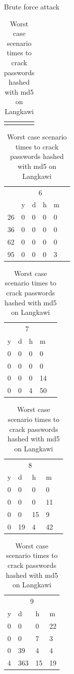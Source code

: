 \documentclass[12pt,aspectratio=169]{beamer}
\begin{document}
\begin{frame}{Brute force attack}
  \begin{table}
    \begin{tabular}{p{10.5cm}}
      \toprule
      \centering{Password length}
    \end{tabular}
    \begin{tabular}{@{} l p{1.2mm}p{1.2mm}p{1.2mm}p{1.2mm} p{0.1mm}}
         & \multicolumn{4}{c}{6} &             \\
         & y                     & d & h & m & \\\midrule
      26 & 0                     & 0 & 0 & 0 & \\
      36 & 0                     & 0 & 0 & 0 & \\
      62 & 0                     & 0 & 0 & 0 & \\
      95 & 0                     & 0 & 0 & 3 & \\\bottomrule
    \end{tabular}%
    \begin{tabular}{p{1.2mm}p{1.2mm}p{1.2mm}p{1.2mm} p{0.1mm}}
      \multicolumn{4}{c}{7} &              \\
      y                     & d & h & m  & \\\midrule
      0                     & 0 & 0 & 0  & \\
      0                     & 0 & 0 & 0  & \\
      0                     & 0 & 0 & 14 & \\
      0                     & 0 & 4 & 50 & \\\bottomrule
    \end{tabular}%
    \begin{tabular}{p{1.2mm}p{1.2mm}p{1.2mm}p{1.2mm} p{0.1mm}}
      \multicolumn{4}{c}{8} &                \\
      y                     & d  & h  & m  & \\\midrule
      0                     & 0  & 0  & 0  & \\
      0                     & 0  & 0  & 11 & \\
      0                     & 0  & 15 & 9  & \\
      0                     & 19 & 4  & 42 & \\\bottomrule
    \end{tabular}%
    \begin{tabular}{p{1.2mm}p{3mm}p{2mm}p{2mm}}
      \multicolumn{4}{c}{9} \\
      y & d   & h  & m      \\\midrule
      0 & 0   & 0  & 22     \\
      0 & 0   & 7  & 3      \\
      0 & 39  & 4  & 4      \\
      4 & 363 & 15 & 19     \\\bottomrule
    \end{tabular}
    \caption{Worst case scenario times to crack passwords hashed with md5 on Langkawi}
  \end{table}
\end{frame}
\end{document}
